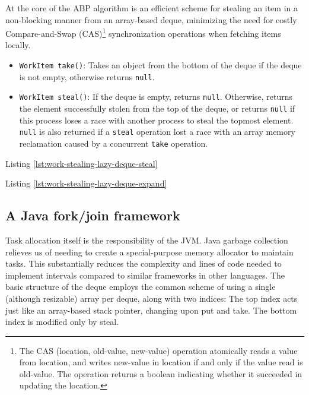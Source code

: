 At the core of the ABP algorithm is an efficient scheme for stealing
an item in a non-blocking manner from an array-based deque, minimizing
the need for costly Compare-and-Swap (CAS)\footnote{The CAS (location,
  old-value, new-value) operation atomically reads a value from
  location, and writes new-value in location if and only if the value
  read is old-value. The operation returns a boolean indicating
  whether it succeeded in updating the location.} synchronization
operations when fetching items locally.



\begin{itemize}
\item \lstinline!WorkItem take()!: Takes an object from the bottom of
  the deque if the deque is not empty, otherwise returns
  \lstinline!null!.
\item \lstinline!WorkItem steal()!: If the deque is empty, returns
  \lstinline!null!. Otherwise, returns the element successfully stolen
  from the top of the deque, or returns \lstinline!null! if this
  process loses a race with another process to steal the topmost
  element. \lstinline!null! is also returned if a \lstinline!steal!
  operation lost a race with an array memory reclamation caused by a
  concurrent \lstinline!take! operation.
\end{itemize}


Listing \ref{lst:work-stealing-lazy-deque-steal}



Listing \ref{lst:work-stealing-lazy-deque-expand}



\subsection{A Java fork/join framework \cite{Lea2000}}

Task allocation itself is the responsibility of the JVM. Java garbage
collection relieves us of needing to create a special-purpose memory
allocator to maintain tasks. This substantially reduces the complexity
and lines of code needed to implement intervals compared to similar
frameworks in other languages. The basic structure of the deque
employs the common scheme of using a single (although resizable) array
per deque, along with two indices: The top index acts just like an
array-based stack pointer, changing upon put and take. The bottom
index is modified only by steal.

